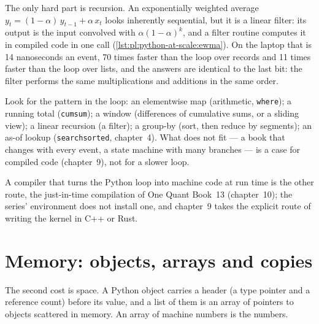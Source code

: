 The only hard part is recursion. An exponentially weighted average $y_t = (1-\alpha)\,y_{t-1} + \alpha\,x_t$ looks inherently
sequential, but it is a linear filter: its output is the input convolved with $\alpha(1-\alpha)^k$, and a filter routine computes
it in compiled code in one call (\cref{lst:pl:python-at-scale:ewma}). On the laptop that is 14 nanoseconds an event, 70 times
faster than the loop over records and 11 times faster than the loop over lists, and the answers are identical to the last bit:
the filter performs the same multiplications and additions in the same order.

\label{lst:pl:python-at-scale:ewma}

\begin{method}\label{met:pl:python-at-scale:arrays}
Look for the pattern in the loop: an elementwise map (arithmetic, \texttt{where}); a running total (\texttt{cumsum}); a window
(differences of cumulative sums, or a sliding view); a linear recursion (a filter); a group-by (sort, then reduce by segments);
an as-of lookup (\texttt{searchsorted}, chapter~4). What does not fit --- a book that changes with every event, a state machine
with many branches --- is a case for compiled code (chapter~9), not for a slower loop.
\end{method}

A compiler that turns the Python loop into machine code at run time is the other route, the just-in-time compilation of One Quant
Book~13 (chapter~10); the series' environment does not install one, and chapter~9 takes the explicit route of writing the kernel in
C++ or Rust.

\section{Memory: objects, arrays and copies}

The second cost is space. A Python object carries a header (a type pointer and a reference count) before its value, and a list of
them is an array of pointers to objects scattered in memory. An array of machine numbers is the numbers.

